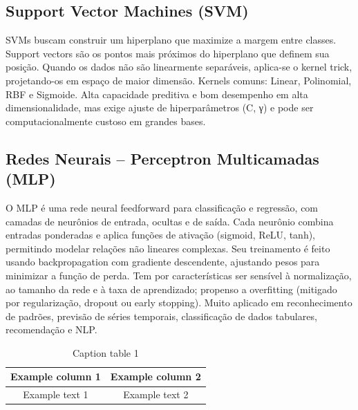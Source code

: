 \documentclass[english, spanish, brazilian]{RBIEarticle} %
\begin{document}
\subsection{Support Vector Machines (SVM)}
SVMs buscam construir um hiperplano que maximize a margem entre classes. Support vectors são os pontos mais próximos do hiperplano que definem sua posição. Quando os dados não são linearmente separáveis, aplica-se o kernel trick, projetando-os em espaço de maior dimensão. Kernels comuns: Linear, Polinomial, RBF e Sigmoide. Alta capacidade preditiva e bom desempenho em alta dimensionalidade, mas exige ajuste de hiperparâmetros (C, γ) e pode ser computacionalmente custoso em grandes bases.

\subsection{Redes Neurais – Perceptron Multicamadas (MLP)}
O MLP é uma rede neural feedforward para classificação e regressão, com camadas de neurônios de entrada, ocultas e de saída. Cada neurônio combina entradas ponderadas e aplica funções de ativação (sigmoid, ReLU, tanh), permitindo modelar relações não lineares complexas.
 Seu treinamento é feito usando backpropagation com gradiente descendente, ajustando pesos para minimizar a função de perda.
 Tem por características ser sensível à normalização, ao tamanho da rede e à taxa de aprendizado; propenso a overfitting (mitigado por regularização, dropout ou early stopping).
 Muito aplicado em reconhecimento de padrões, previsão de séries temporais, classificação de dados tabulares, recomendação e NLP.




\iffalse %
    \begin{table}[h]
    	\caption{Caption table 1}
    	\label{tab:one}
    	\centering\footnotesize%
    	\begin{tabular}{|c|c|}
    		\hline
    		\rowcolor{gray} \textbf{Example column 1} & \textbf{Example column 2}\\
    		\hline
    		Example text 1 & Example text 2\\
    		\hline
    	\end{tabular}
    \end{table}
\end{document}
